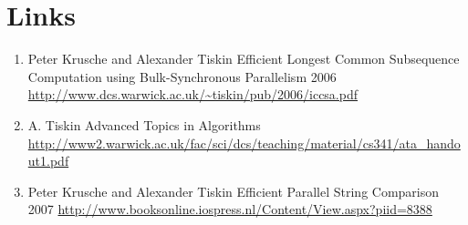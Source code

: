 \documentclass[a4paper]{article}
\begin{document}
\section{Links}
\begin{enumerate}
    \item Peter Krusche and Alexander Tiskin Efficient Longest Common Subsequence
            Computation using Bulk-Synchronous Parallelism 2006 \url{http://www.dcs.warwick.ac.uk/~tiskin/pub/2006/iccsa.pdf}
  \item  A. Tiskin Advanced Topics in Algorithms \url{http://www2.warwick.ac.uk/fac/sci/dcs/teaching/material/cs341/ata_handout1.pdf}
  \item Peter Krusche and Alexander Tiskin Efficient Parallel String Comparison 2007 \url{http://www.booksonline.iospress.nl/Content/View.aspx?piid=8388}
\end{enumerate}
\end{document}
